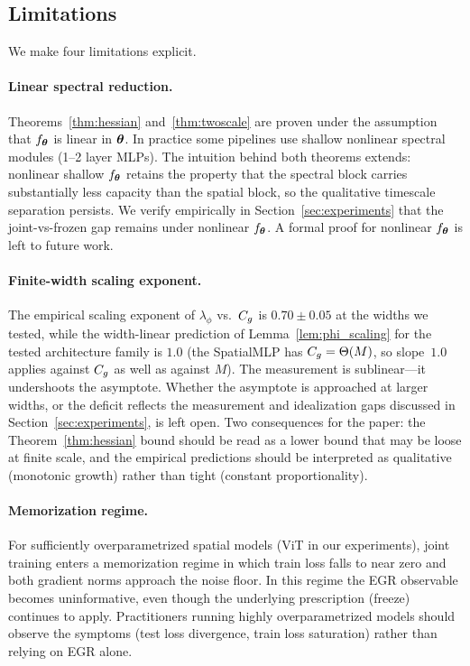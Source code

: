 \subsection{Limitations}

We make four limitations explicit.

\paragraph{Linear spectral reduction.}
Theorems~\ref{thm:hessian} and~\ref{thm:twoscale} are proven under the
assumption that $f_{\boldsymbol{\theta}}$ is linear in ${\boldsymbol{\theta}}$. In practice some
pipelines use shallow nonlinear spectral modules (1--2 layer MLPs).
The intuition behind both theorems extends: nonlinear shallow
$f_{\boldsymbol{\theta}}$ retains the property that the spectral block carries
substantially less capacity than the spatial block, so the
qualitative timescale separation persists. We verify empirically in
Section~\ref{sec:experiments} that the joint-vs-frozen gap remains
under nonlinear $f_{\boldsymbol{\theta}}$. A formal proof for nonlinear $f_{\boldsymbol{\theta}}$
is left to future work.

\paragraph{Finite-width scaling exponent.}
The empirical scaling exponent of $\lambda_\phi$ vs.\ $C_g$ is
$0.70 \pm 0.05$ at the widths we tested, while the width-linear
prediction of Lemma~\ref{lem:phi_scaling} for the tested
architecture family is $1.0$ (the SpatialMLP has
$C_g = \Theta(M)$, so slope~$1.0$ applies against $C_g$ as well as
against $M$). The measurement is sublinear---it undershoots the
asymptote. Whether the asymptote is approached at larger widths, or
the deficit reflects the measurement and idealization gaps discussed
in Section~\ref{sec:experiments}, is left open. Two consequences for
the paper: the Theorem~\ref{thm:hessian} bound should be read as a
lower bound that may be loose at finite scale, and the empirical
predictions should be interpreted as qualitative (monotonic growth)
rather than tight (constant proportionality).

\paragraph{Memorization regime.}
For sufficiently overparametrized spatial models (ViT in our
experiments), joint training enters a memorization regime in which
train loss falls to near zero and both gradient norms approach the
noise floor. In this regime the EGR observable becomes uninformative,
even though the underlying prescription (freeze) continues to apply.
Practitioners running highly overparametrized models should observe
the symptoms (test loss divergence, train loss saturation) rather than
relying on EGR alone.

